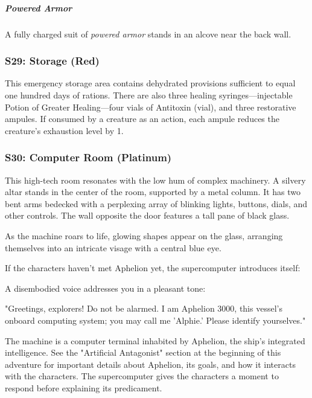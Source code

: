 \documentclass[10pt,a4paper,twoside,bg=print,twocolumn,openany,nodeprecatedcode]{dndbook}
\begin{document}
\subparagraph{Powered Armor}
A fully charged suit of \textit{powered armor} stands in an alcove near the back wall.

\subsubsection{S29: Storage (Red)}
This emergency storage area contains dehydrated provisions sufficient to equal one hundred days of rations. There are also three healing syringes—injectable Potion of Greater Healing—four vials of Antitoxin (vial), and three restorative ampules. If consumed by a creature as an action, each ampule reduces the creature's exhaustion level by 1.

\subsubsection{S30: Computer Room (Platinum)}
\begin{DndReadAloud}{}
This high-tech room resonates with the low hum of complex machinery. A silvery altar stands in the center of the room, supported by a metal column. It has two bent arms bedecked with a perplexing array of blinking lights, buttons, dials, and other controls. The wall opposite the door features a tall pane of black glass.

As the machine roars to life, glowing shapes appear on the glass, arranging themselves into an intricate visage with a central blue eye.

\end{DndReadAloud}

If the characters haven't met Aphelion yet, the supercomputer introduces itself:

\begin{DndReadAloud}{}
A disembodied voice addresses you in a pleasant tone:

"Greetings, explorers! Do not be alarmed. I am Aphelion 3000, this vessel's onboard computing system; you may call me 'Alphie.' Please identify yourselves."

\end{DndReadAloud}

The machine is a computer terminal inhabited by Aphelion, the ship's integrated intelligence. See the "Artificial Antagonist" section at the beginning of this adventure for important details about Aphelion, its goals, and how it interacts with the characters. The supercomputer gives the characters a moment to respond before explaining its predicament.
\end{document}
